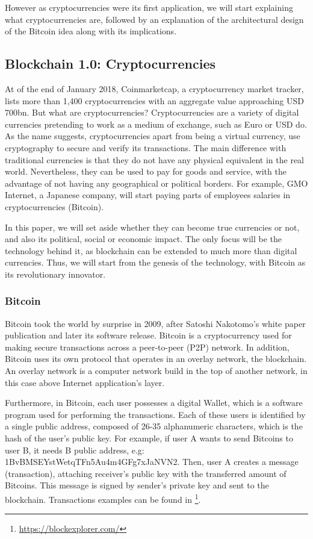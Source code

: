 However as cryptocurrencies were its first application, we will start explaining what cryptocurrencies are, followed by an explanation of the architectural design of the Bitcoin idea along with its implications.

\subsection{Blockchain 1.0: Cryptocurrencies}

At of the end of January 2018, Coinmarketcap, a cryptocurrency market tracker, lists more than 1,400 cryptocurrencies with an aggregate value approaching USD 700bn.  But what are cryptocurrencies? Cryptocurrencies are a variety of digital currencies pretending to work as a medium of exchange, such as Euro or USD do. As the name suggests, cryptocurrencies apart from being a virtual currency, use cryptography to secure and verify its transactions. The main difference with traditional currencies is that they do not have any physical equivalent in the real world. Nevertheless, they can be used to pay for goods and service, with the advantage of not having any geographical or political borders. For example, GMO Internet, a Japanese company, will start paying parts of employees salaries in cryptocurrencies (Bitcoin).

In this paper, we will set aside whether they can become true currencies or not, and also its political, social or economic impact. The only focus will be the technology behind it, as blockchain can be extended to much more than digital currencies. Thus, we will start from the genesis of the technology, with Bitcoin as its revolutionary innovator.


\subsubsection{Bitcoin}

Bitcoin took the world by surprise in 2009, after Satoshi Nakotomo's white paper publication \cite{nakamoto2008bitcoin} and later its software release. Bitcoin is a cryptocurrency used for making secure transactions across a peer-to-peer (P2P) network. In addition, Bitcoin uses its own protocol that operates in an overlay network, the blockchain. An overlay network is a computer network build in the top of another network, in this case above Internet application's layer.

Furthermore, in Bitcoin, each user possesses a digital Wallet, which is a software program used for performing the transactions. Each of these users is identified by a single public address, composed of 26-35 alphanumeric characters, which is the hash of the user's public key. For example, if user A wants to send Bitcoins to user B, it needs B public address, e.g: 1BvBMSEYstWetqTFn5Au4m4GFg7xJaNVN2. Then, user A creates a message (transaction), attaching receiver's public key with the transferred amount of Bitcoins. This message is signed by sender's private key and sent to the blockchain. Transactions examples can be found in \footnote{\url{https://blockexplorer.com/}}.

